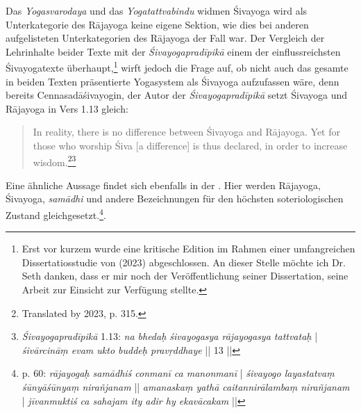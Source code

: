 Das \textit{Yogasvarodaya} und das \textit{Yogatattvabindu} widmen Śivayoga wird als Unterkategorie des Rājayoga keine eigene Sektion, wie dies bei anderen aufgelisteten Unterkategorien des Rājayoga der Fall war. Der Vergleich der Lehrinhalte beider Texte mit der \textit{Śivayogapradīpikā} einem der einflussreichsten Śivayogatexte überhaupt,\footnote{Erst vor kurzem wurde eine kritische Edition im Rahmen einer umfangreichen Dissertatiosstudie von \citeauthor{powell2023} (2023) abgeschlossen. An dieser Stelle möchte ich Dr. Seth \citeauthor{powell2023} danken, dass er mir noch der Veröffentlichung seiner Dissertation, seine Arbeit zur Einsicht zur Verfügung stellte.} wirft jedoch die Frage auf, ob nicht auch das gesamte in beiden Texten präsentierte Yogasystem als Śivayoga aufzufassen wäre, denn bereits Cennasadāśivayogin, der Autor der \textit{Śivayogapradīpikā} setzt Śivayoga und Rājayoga in Vers 1.13 gleich:
\begin{quote}
In reality, there is no difference between Śivayoga and Rājayoga. Yet for those who worship Śiva [a difference] is thus declared, in order to increase wisdom.\footnote{Translated by \citeauthor{powell2023} 2023, p. 315.}\footnote{\textit{Śivayogapradīpikā} 1.13: \textit{na bhedaḥ śivayogasya rājayogasya tattvataḥ} | \textit{śivārcināṃ evam ukto buddeḥ pravṛddhaye} || 13 ||} 
\end{quote}
Eine ähnliche Aussage findet sich ebenfalls in der . Hier werden Rājayoga, Śivayoga, \textit{samādhi} und andere Bezeichnungen für den höchsten soteriologischen Zustand gleichgesetzt.\footnote{ p. 60: \textit{rājayogaḥ samādhiś conmanī ca manonmanī} | \textit{śivayogo layastatvaṃ śūnyāśūnyaṃ nirañjanam} || \textit{amanaskaṃ yathā caitannirālambaṃ nirañjanam} | \textit{jīvanmuktiś ca sahajam ity adir hy ekavācakam} ||}. 
